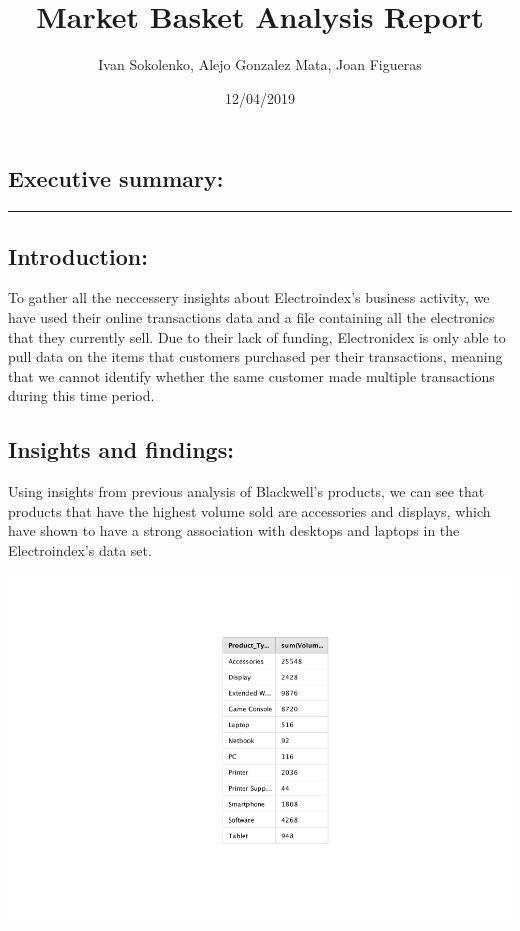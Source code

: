 \documentclass[]{article}
\title{Market Basket Analysis Report}
\author{Ivan Sokolenko, Alejo Gonzalez Mata, Joan Figueras}
\date{12/04/2019}
\begin{document}
\maketitle

{
\setcounter{tocdepth}{4}
\tableofcontents
}
\subsection{Executive summary:}\label{executive-summary}

\begin{center}\rule{0.5\linewidth}{\linethickness}\end{center}

\subsection{Introduction:}\label{introduction}

To gather all the neccessery insights about Electroindex's business
activity, we have used their online transactions data and a file
containing all the electronics that they currently sell. Due to their
lack of funding, Electronidex is only able to pull data on the items
that customers purchased per their transactions, meaning that we cannot
identify whether the same customer made multiple transactions during
this time period.

\subsection{Insights and findings:}\label{insights-and-findings}

Using insights from previous analysis of Blackwell's products, we can
see that products that have the highest volume sold are accessories and
displays, which have shown to have a strong association with desktops
and laptops in the Electroindex's data set.

\includegraphics{markdown_report_files/figure-latex/pic1-1.pdf}
\end{document}
